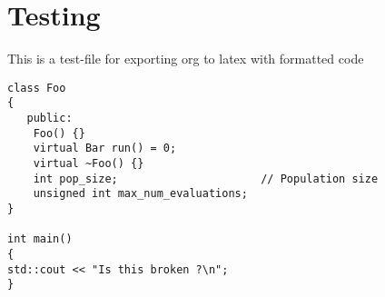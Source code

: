 \documentclass[a4paper,12pt]{article}
\author{Justin Kaipada}
\date{\today}
\title{}
\begin{document}
\section*{Testing}
\label{sec:orgbb8df63}
This is a test-file for exporting org to latex with formatted code

\lstset{language=C++,label= ,caption= ,captionpos=b,numbers=none}
\begin{lstlisting}
class Foo
{
   public:
    Foo() {}
    virtual Bar run() = 0;
    virtual ~Foo() {}
    int pop_size;                      // Population size
    unsigned int max_num_evaluations;
}

int main()
{
std::cout << "Is this broken ?\n";
}
\end{lstlisting}
\end{document}
